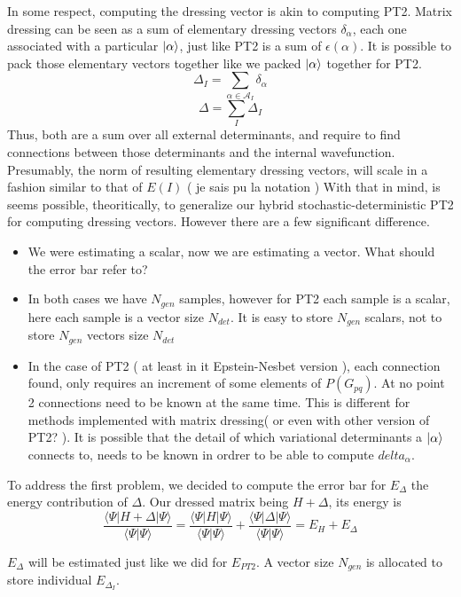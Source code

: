 \documentclass[./thesis.tex]{subfiles}
\begin{document}
In some respect, computing the dressing vector is akin to computing PT2. Matrix dressing can be seen as a sum of elementary dressing vectors $\delta_\alpha$, each one associated with a particular $\ket \alpha$, just like PT2 is a sum of $\epsilon(\alpha)$. It is possible to pack those elementary vectors together like we packed $\ket \alpha$ together for PT2.
$$\Delta_I = \sum_{\alpha \in \mathcal{A}_I} \delta_\alpha$$
$$\Delta = \sum_{I} \Delta_I$$
Thus, both are a sum over all external determinants, and require to find connections between those determinants and the internal wavefunction. Presumably, the norm of resulting elementary dressing vectors, will scale in a fashion similar to that of $E(I)$ ( je sais pu la notation )
With that in mind, is seems possible, theoritically, to generalize our hybrid stochastic-deterministic PT2 for computing dressing vectors.
However there are a few significant difference.
\begin{itemize}
\item
We were estimating a scalar, now we are estimating a vector. What should the error bar refer to?
\item
In both cases we have $N_{gen}$ samples, however for PT2 each sample is a scalar, here each sample is a vector size $N_{det}$. It is easy to store $N_{gen}$ scalars, not to store $N_{gen}$ vectors size $N_{det}$
\item
In the case of PT2 ( at least in it Epstein-Nesbet version ), each connection found, only requires an increment of some elements of $P(G_{pq})$. At no point 2 connections need to be known at the same time. This is different for methods implemented with matrix dressing( or even with other version of PT2? ). It is possible that the detail of which variational determinants a $\ket \alpha$ connects to, needs to be known in ordrer to be able to compute $delta_\alpha$.
\end{itemize}

To address the first problem, we decided to compute the error bar for $E_{\Delta}$ the energy contribution of $\Delta$. Our dressed matrix being $H + \Delta$, its energy is
    $$\frac{\langle \Psi |H + \Delta | \Psi\rangle}{\langle \Psi | \Psi \rangle} = \frac{\langle \Psi |H  | \Psi\rangle}{\langle \Psi | \Psi \rangle} + \frac{\langle \Psi |\Delta | \Psi\rangle}{\langle \Psi | \Psi \rangle} = E_H + E_{\Delta} $$

$E_{\Delta}$ will be estimated just like we did for $E_{PT2}$. A vector size $N_{gen}$ is allocated to store individual $E_{\Delta_I}$.
\end{document}
